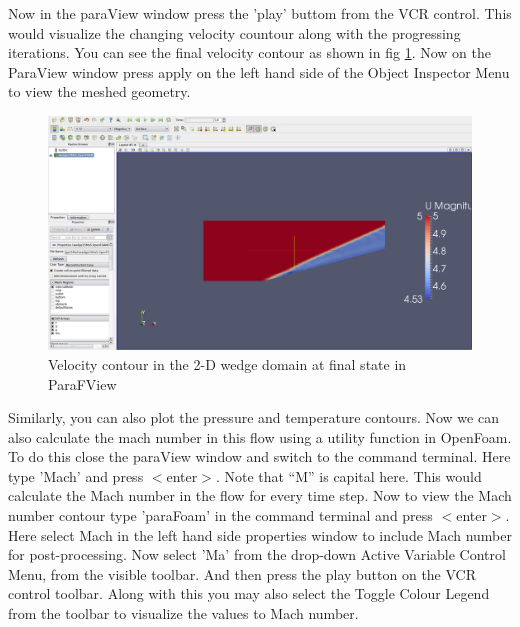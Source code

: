 \documentclass[a4paper,12pt]{report}
\begin{document}
\flushleft Now in the paraView window press the 'play' buttom from the VCR control. This would visualize the changing velocity countour along with the progressing iterations. You can see the final velocity contour as shown in fig \ref{vel}. Now on the ParaView window press apply on the left hand side of the Object Inspector Menu to view the meshed geometry. 

\begin{figure}[ht]  
\begin{center}  
\includegraphics[scale=0.24]{vel.png}
\caption{Velocity contour in the 2-D wedge domain at final state in ParaFView}
\label{vel}
\end{center}  
\end{figure}

\flushleft Similarly, you can also plot the pressure and temperature contours.
\flushleft Now we can also calculate the mach number in this flow using a utility function in OpenFoam. To do this close the paraView window and switch to the command terminal. Here type 'Mach' and press $<$enter$>$. Note that “M” is capital here. This would calculate the Mach number in the flow for every time step.
\flushleft Now to view the Mach number contour type 'paraFoam' in the command terminal and press $<$enter$>$. Here select Mach in the left hand side properties window to include Mach number for post-processing. Now select 'Ma' from the drop-down Active Variable Control Menu, from the visible toolbar. And then press the play button on the VCR control toolbar. Along with this you may also select the Toggle Colour Legend from the toolbar to visualize the values to Mach number.
\end{document}
